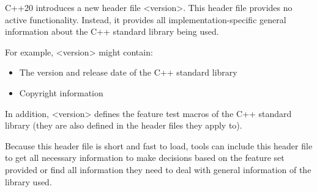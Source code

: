 C++20 introduces a new header file <version>. This header file provides no active functionality. Instead, it provides all implementation-specific general information about the C++ standard library being used.

For example, <version> might contain:

\begin{itemize}
\item 
The version and release date of the C++ standard library

\item 
Copyright information
\end{itemize}


In addition, <version> defines the feature test macros of the C++ standard library (they are also defined in the header files they apply to).

Because this header file is short and fast to load, tools can include this header file to get all necessary information to make decisions based on the feature set provided or find all information they need to deal with general information of the library used.







